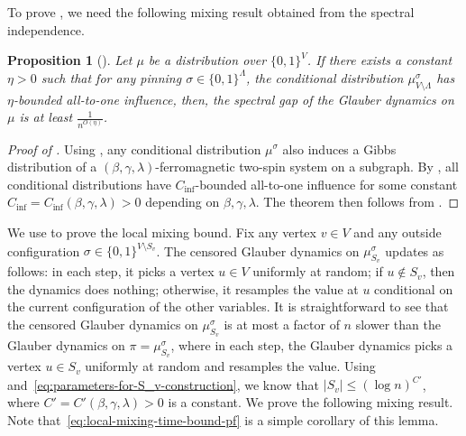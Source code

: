 \documentclass[11pt]{amsart}
\newtheorem{proposition}[theorem]{Proposition}
\theoremstyle{definition}
\theoremstyle{remark}
\begin{document}
To prove , we need the following mixing result obtained from the spectral independence.

\begin{proposition}[\cite{ALO24}]\label{prop:spectral-independence}
Let $\mu$ be a distribution over $\{0,1\}^V$. If there exists a constant $\eta > 0$ such that for any pinning $\sigma \in \{0,1\}^\Lambda$, the conditional distribution $\mu^\sigma_{V \setminus \Lambda}$ has $\eta$-bounded all-to-one influence, then, the spectral gap of the Glauber dynamics on $\mu$ is at least $\frac{1}{n^{O(\eta)}}$. 
\end{proposition}


\begin{proof}[Proof of ]
Using , any conditional distribution $\mu^\sigma$ also induces a Gibbs distribution of a $(\beta,\gamma,\lambda)$-ferromagnetic two-spin system on a subgraph. By , all conditional distributions have $C_{\text{inf}}$-bounded all-to-one influence for some constant $C_{\text{inf}}  = C_{\text{inf}}(\beta,\gamma,\lambda) > 0$ depending on $\beta,\gamma,\lambda$.
The theorem then follows from .
\end{proof}

We use  to prove the local mixing bound. Fix any vertex $v \in V$ and any outside configuration $\sigma \in \{0,1\}^{V \setminus S_v}$. The censored Glauber dynamics on $\mu^\sigma_{S_v}$ updates as follows: in each step, it picks a vertex $u \in V$ uniformly at random; if $u \notin S_v$, then the dynamics does nothing; otherwise, it resamples the value at $u$ conditional on the current configuration of the other variables. It is straightforward to see that the censored Glauber dynamics on $\mu^\sigma_{S_v}$ is at most a factor of $n$ slower than the Glauber dynamics on $\pi = \mu^\sigma_{S_v}$, where in each step, the Glauber dynamics picks a vertex $u \in S_v$ uniformly at random and resamples the value.
Using  and~\eqref{eq:parameters-for-S_v-construction}, we know that $|S_v| \leq (\log n)^{C'}$, where $C' = C'(\beta,\gamma,\lambda) > 0$ is a constant. We prove the following mixing result. Note that~\eqref{eq:local-mixing-time-bound-pf} is a simple corollary of this lemma.
\end{document}
